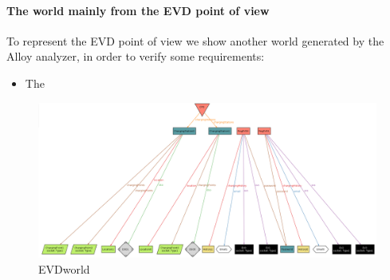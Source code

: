 \paragraph{The world mainly from the EVD point of view}
To represent the EVD point of view we show another world generated by the Alloy analyzer, in order to verify some requirements: 
\begin{itemize}
    \item The 
\end{itemize}
\begin{figure}[H]
    \centering
    \includegraphics[width=1\textwidth]{Images/cp4/EVDWorldAndCPO.png}
    \caption{EVDworld}
\end{figure}

